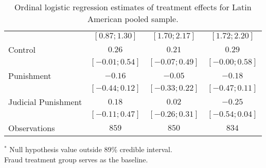 \begin{table}[h]
\begin{center}
\begin{threeparttable}
\begin{tabular}{l c c c}
                    & $ [ 0.87;  1.30]$ & $ [ 1.70;  2.17]$ & $ [ 1.72;  2.20]$ \\
Control             & $0.26$            & $0.21$            & $0.29$            \\
                    & $ [-0.01;  0.54]$ & $ [-0.07;  0.49]$ & $ [-0.00;  0.58]$ \\
Punishment          & $-0.16$           & $-0.05$           & $-0.18$           \\
                    & $ [-0.44;  0.12]$ & $ [-0.33;  0.22]$ & $ [-0.47;  0.11]$ \\
Judicial Punishment & $0.18$            & $0.02$            & $-0.25$           \\
                    & $ [-0.11;  0.47]$ & $ [-0.26;  0.31]$ & $ [-0.54;  0.04]$ \\
\hline
Observations        & $859$             & $850$             & $834$             \\
\hline
\end{tabular}
\begin{tablenotes}[flushleft]
\scriptsize{$^*$ Null hypothesis value outside 89\% credible interval.  \\
Fraud treatment group serves as the baseline.}
\end{tablenotes}
\end{threeparttable}
\caption{Ordinal logistic regression estimates of treatment effects for Latin American pooled sample.}
\label{table:coefficients}
\end{center}
\end{table}
